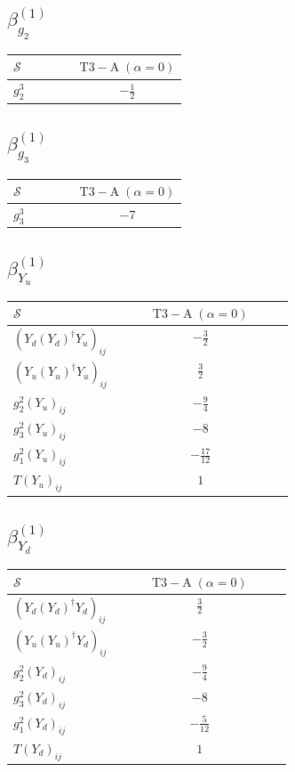 \documentclass[9pt]{article}
\begin{document}
\subsection*{$ \beta_{g_2}^{(1)} $}
\begin{longtable}{@{}p{0.38\linewidth}c@{}}
\toprule
$\mathcal{S}$ & $ \mathrm{T3-A}\;(\alpha=0) $ \\
\midrule
$ g_2^3 $ & $ - \frac{1}{2} $ \\
\bottomrule
\end{longtable}
\subsection*{$ \beta_{g_3}^{(1)} $}
\begin{longtable}{@{}p{0.38\linewidth}c@{}}
\toprule
$\mathcal{S}$ & $ \mathrm{T3-A}\;(\alpha=0) $ \\
\midrule
$ g_3^3 $ & $ -7 $ \\
\bottomrule
\end{longtable}
\subsection*{$ \beta_{Y_u}^{(1)} $}
\begin{longtable}{@{}p{0.38\linewidth}c@{}}
\toprule
$\mathcal{S}$ & $ \mathrm{T3-A}\;(\alpha=0) $ \\
\midrule
$ (Y_d (Y_d)^{\dagger} Y_u)_{ij} $ & $ - \frac{3}{2} $ \\
$ (Y_u (Y_u)^{\dagger} Y_u)_{ij} $ & $ \frac{3}{2} $ \\
$ g_2^2 (Y_u)_{ij} $ & $ - \frac{9}{4} $ \\
$ g_3^2 (Y_u)_{ij} $ & $ -8 $ \\
$ g_1^2 (Y_u)_{ij} $ & $ - \frac{17}{12} $ \\
$ T (Y_u)_{ij} $ & $ 1 $ \\
\bottomrule
\end{longtable}
\subsection*{$ \beta_{Y_d}^{(1)} $}
\begin{longtable}{@{}p{0.38\linewidth}c@{}}
\toprule
$\mathcal{S}$ & $ \mathrm{T3-A}\;(\alpha=0) $ \\
\midrule
$ (Y_d (Y_d)^{\dagger} Y_d)_{ij} $ & $ \frac{3}{2} $ \\
$ (Y_u (Y_u)^{\dagger} Y_d)_{ij} $ & $ - \frac{3}{2} $ \\
$ g_2^2 (Y_d)_{ij} $ & $ - \frac{9}{4} $ \\
$ g_3^2 (Y_d)_{ij} $ & $ -8 $ \\
$ g_1^2 (Y_d)_{ij} $ & $ - \frac{5}{12} $ \\
$ T (Y_d)_{ij} $ & $ 1 $ \\
\bottomrule
\end{longtable}
\end{document}
